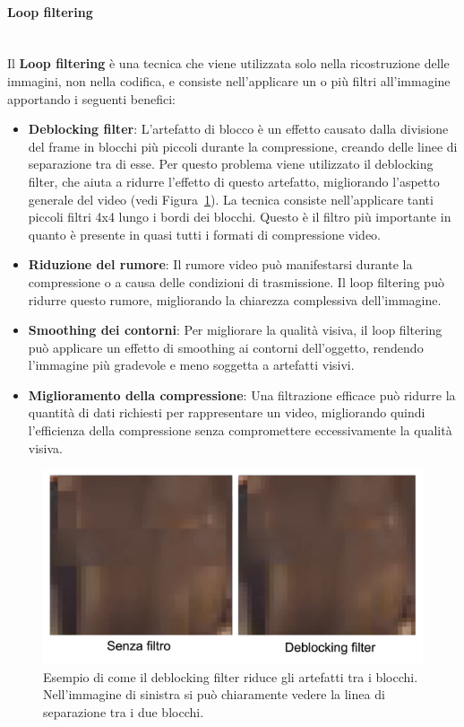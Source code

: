 \documentclass[a4paper,12pt, oneside]{article}
\begin{document}
\paragraph{Loop filtering}\hphantom{A}\\
Il \textbf{Loop filtering} è una tecnica che viene utilizzata solo nella ricostruzione delle immagini,
non nella codifica, e consiste nell'applicare un o più filtri all'immagine apportando i seguenti benefici:

\begin{itemize}
    \item \textbf{Deblocking filter}: L'artefatto di blocco è un effetto causato dalla divisione del frame
    in blocchi più piccoli durante la compressione, creando delle linee di separazione tra di esse.
    Per questo problema viene utilizzato il deblocking filter, che aiuta a ridurre l'effetto di questo
    artefatto, migliorando l'aspetto generale del video (vedi Figura~\ref{fig:deblocking_filter}). La
    tecnica consiste nell'applicare tanti piccoli filtri 4x4 lungo i bordi dei blocchi.
    Questo è il filtro più importante in quanto è presente in quasi tutti i formati di compressione video.
    \item \textbf{Riduzione del rumore}: Il rumore video può manifestarsi durante la compressione
    o a causa delle condizioni di trasmissione. Il loop filtering può ridurre questo rumore,
    migliorando la chiarezza complessiva dell'immagine.
    \item \textbf{Smoothing dei contorni}: Per migliorare la qualità visiva, il loop filtering può
    applicare un effetto di smoothing ai contorni dell'oggetto, rendendo l'immagine più gradevole e
    meno soggetta a artefatti visivi.
    \item \textbf{Miglioramento della compressione}: Una filtrazione efficace può ridurre la quantità
    di dati richiesti per rappresentare un video, migliorando quindi l'efficienza della compressione
    senza compromettere eccessivamente la qualità visiva.
\end{itemize}

\begin{figure}[h]
    \centering
    \includegraphics[width=1\textwidth]{images/deblocking-filter.png}
    \caption{Esempio di come il deblocking filter riduce gli artefatti tra i blocchi. Nell'immagine di
    sinistra si può chiaramente vedere la linea di separazione tra i due blocchi.}
    \label{fig:deblocking_filter}
\end{figure}
\end{document}
